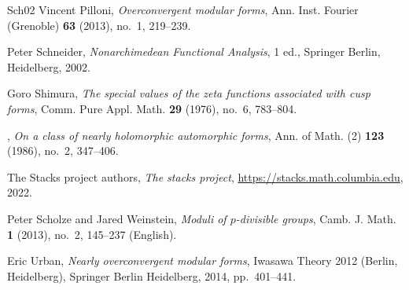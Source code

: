\begin{thebibliography}{{Sch}02}
Vincent Pilloni, \emph{Overconvergent modular forms}, Ann. Inst. Fourier
  (Grenoble) \textbf{63} (2013), no.~1, 219--239.

Peter {Schneider}, \emph{{N}onarchimedean {F}unctional {A}nalysis}, 1 ed.,
  Springer Berlin, Heidelberg, 2002.

Goro Shimura, \emph{The special values of the zeta functions associated with
  cusp forms}, Comm. Pure Appl. Math. \textbf{29} (1976), no.~6, 783--804.

\bysame, \emph{On a class of nearly holomorphic automorphic forms}, Ann. of
  Math. (2) \textbf{123} (1986), no.~2, 347--406.

The {Stacks project authors}, \emph{The stacks project},
  \url{https://stacks.math.columbia.edu}, 2022.

Peter Scholze and Jared Weinstein, \emph{Moduli of {{\(p\)}}-divisible groups},
  Camb. J. Math. \textbf{1} (2013), no.~2, 145--237 (English).

Eric Urban, \emph{Nearly overconvergent modular forms}, Iwasawa Theory 2012
  (Berlin, Heidelberg), Springer Berlin Heidelberg, 2014, pp.~401--441.

\end{thebibliography}
